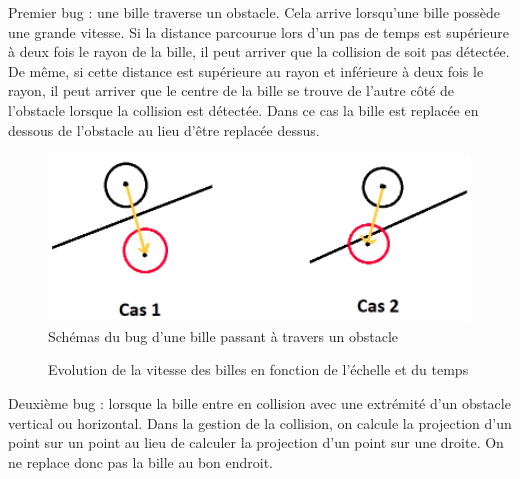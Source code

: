 \documentclass{report}
\begin{document}
Premier bug : une bille traverse un obstacle. Cela arrive lorsqu’une bille possède une grande vitesse. Si la distance parcourue lors d’un pas de temps est supérieure à deux fois le rayon de la bille, il peut arriver que la collision de soit pas détectée. De même, si cette distance est supérieure au rayon et inférieure à deux fois le rayon, il peut arriver que le centre de la bille se trouve de l’autre côté de l’obstacle lorsque la collision est détectée. Dans ce cas la bille est replacée en dessous de l’obstacle au lieu d’être replacée dessus.

\begin{figure}[H]
\centering
\includegraphics[scale=1]{bug_1.PNG}
\caption{Schémas du bug d'une bille passant à travers un obstacle}
\end{figure}

\begin{figure}[H]
\centering
{}
\caption{Evolution de la vitesse des billes en fonction de l'échelle et du temps}
\end{figure}

\newpage
Deuxième bug : lorsque la bille entre en collision avec une extrémité d’un obstacle vertical ou horizontal. Dans la gestion de la collision, on calcule la projection d’un point sur un point au lieu de calculer la projection d’un point sur une droite. On ne replace donc pas la bille au bon endroit.
\end{document}
